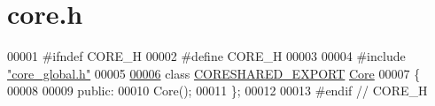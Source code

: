 \hypertarget{a00014_source}{}\section{core.\+h}
\label{a00014_source}

\begin{DoxyCode}
00001 \textcolor{preprocessor}{#}\textcolor{preprocessor}{ifndef} \textcolor{preprocessor}{CORE\_H}
00002 \textcolor{preprocessor}{#}\textcolor{preprocessor}{define} \textcolor{preprocessor}{CORE\_H}
00003 
00004 \textcolor{preprocessor}{#}\textcolor{preprocessor}{include} \hyperlink{a00017}{"core\_global.h"}
00005 
\hyperlink{a00145}{00006} \textcolor{keyword}{class} \hyperlink{a00017_a35b4f560a49976697e57858385e52c17}{CORESHARED\_EXPORT} \hyperlink{a00145}{Core}
00007 \{
00008 
00009 \textcolor{keyword}{public}:
00010     Core();
00011 \};
00012 
00013 \textcolor{preprocessor}{#}\textcolor{preprocessor}{endif} \textcolor{comment}{// CORE\_H}
\end{DoxyCode}
